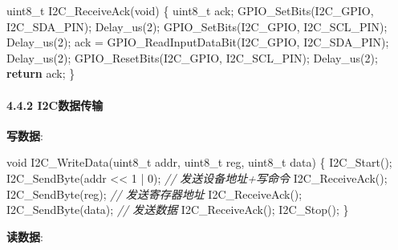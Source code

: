 \documentclass[
]{article}
\newenvironment{Shaded}{}{}
\newcommand{\CommentTok}[1]{\textcolor[rgb]{0.38,0.63,0.69}{\textit{#1}}}
\newcommand{\ControlFlowTok}[1]{\textcolor[rgb]{0.00,0.44,0.13}{\textbf{#1}}}
\newcommand{\DataTypeTok}[1]{\textcolor[rgb]{0.56,0.13,0.00}{#1}}
\newcommand{\DecValTok}[1]{\textcolor[rgb]{0.25,0.63,0.44}{#1}}
\newcommand{\NormalTok}[1]{#1}
\begin{document}
\begin{Shaded}
\begin{Highlighting}[]
\DataTypeTok{uint8\_t}\NormalTok{ I2C\_ReceiveAck(}\DataTypeTok{void}\NormalTok{)}
\NormalTok{\{}
    \DataTypeTok{uint8\_t}\NormalTok{ ack;}
\NormalTok{    GPIO\_SetBits(I2C\_GPIO, I2C\_SDA\_PIN);}
\NormalTok{    Delay\_us(}\DecValTok{2}\NormalTok{);}
\NormalTok{    GPIO\_SetBits(I2C\_GPIO, I2C\_SCL\_PIN);}
\NormalTok{    Delay\_us(}\DecValTok{2}\NormalTok{);}
\NormalTok{    ack = GPIO\_ReadInputDataBit(I2C\_GPIO, I2C\_SDA\_PIN);}
\NormalTok{    Delay\_us(}\DecValTok{2}\NormalTok{);}
\NormalTok{    GPIO\_ResetBits(I2C\_GPIO, I2C\_SCL\_PIN);}
\NormalTok{    Delay\_us(}\DecValTok{2}\NormalTok{);}
    \ControlFlowTok{return}\NormalTok{ ack;}
\NormalTok{\}}
\end{Highlighting}
\end{Shaded}

\hypertarget{i2cux6570ux636eux4f20ux8f93}{%
\paragraph{4.4.2 I2C数据传输}\label{i2cux6570ux636eux4f20ux8f93}}

\textbf{写数据}:

\begin{Shaded}
\begin{Highlighting}[]
\DataTypeTok{void}\NormalTok{ I2C\_WriteData(}\DataTypeTok{uint8\_t}\NormalTok{ addr, }\DataTypeTok{uint8\_t}\NormalTok{ reg, }\DataTypeTok{uint8\_t}\NormalTok{ data)}
\NormalTok{\{}
\NormalTok{    I2C\_Start();}
\NormalTok{    I2C\_SendByte(addr \textless{}\textless{} }\DecValTok{1}\NormalTok{ | }\DecValTok{0}\NormalTok{);  }\CommentTok{// 发送设备地址+写命令}
\NormalTok{    I2C\_ReceiveAck();}
\NormalTok{    I2C\_SendByte(reg);             }\CommentTok{// 发送寄存器地址}
\NormalTok{    I2C\_ReceiveAck();}
\NormalTok{    I2C\_SendByte(data);            }\CommentTok{// 发送数据}
\NormalTok{    I2C\_ReceiveAck();}
\NormalTok{    I2C\_Stop();}
\NormalTok{\}}
\end{Highlighting}
\end{Shaded}

\textbf{读数据}:
\end{document}
